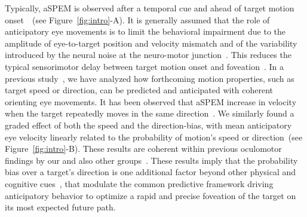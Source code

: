\documentclass[profile,final,english, draft]{article}%
\newcommand{\citep}[1]{\parencite{#1}}
\newcommand{\seeFig}[1]{see Figure~\ref{fig:#1}}
\begin{document}
Typically, aSPEM is observed after a temporal cue and
ahead of target motion onset~\citep{Kowler1979a,Kowler1979b, Kowler1984}~(\seeFig{intro}-A).
It is generally assumed that the role of anticipatory eye movements is
to limit the behavioral impairment due
to the amplitude of eye-to-target position and velocity mismatch and
of the variability introduced by the neural noise 
at the neuro-motor junction~\citep{WolpertXXX}.
This reduces the typical sensorimotor delay
between target motion onset and foveation~\citep{PerrinetAdamasFriston2014}.
In a previous study~\citep{Montagnini2010},
we have analyzed how forthcoming motion properties,
such as target speed or direction, can be
predicted and anticipated with coherent orienting eye movements.
It has been observed that aSPEM increase in velocity
when the target repeatedly moves in the same direction~\citep{Kowler1984, Kowler1989, Heinen2005}.
We similarly found a graded effect of both the speed and the direction-bias,
with mean anticipatory eye velocity
linearly related to the probability of motion's speed or direction~(\seeFig{intro}-B).
These results are coherent within previous oculomotor findings
by our and also other groups~\citep{SantosKowler2017}.
These results imply that the probability bias over a target's direction is
one additional factor beyond other physical and cognitive cues~\citep{Kowler2014, SantosKowler2017},
that modulate the common predictive framework
driving anticipatory behavior to optimize a rapid and
precise foveation of the target on its most expected future path.
\end{document}
